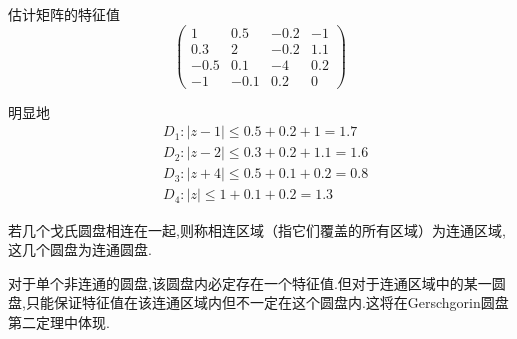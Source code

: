 \begin{brown}
\begin{example}
    估计矩阵的特征值
    \[
    \begin{pmatrix}
        1&0.5&-0.2&-1\\
        0.3&2&-0.2&1.1\\
        -0.5&0.1&-4&0.2\\
        -1&-0.1&0.2&0
    \end{pmatrix}
    \]
\end{example}
\begin{solution}
    明显地
    \begin{align*}
        &D_1: \left|
            z-1
        \right|\leqslant 0.5+0.2+1=1.7\\
        &D_2: \left|
            z-2
        \right|\leqslant 0.3+0.2+1.1=1.6\\
        &D_3: \left|
            z+4
        \right|\leqslant 0.5+0.1+0.2=0.8\\
        &D_4: \left|
            z
        \right|\leqslant 1+0.1+0.2=1.3
    \end{align*}
\end{solution}
\end{brown}
\begin{formal}
\begin{definition}[连通区域]\label{def:连通区域}
    若几个戈氏圆盘相连在一起,则称相连区域（指它们覆盖的所有区域）为连通区域,这几个圆盘为连通圆盘.
\end{definition}
\end{formal}
\begin{red}
\begin{remark}
    对于单个非连通的圆盘,该圆盘内必定存在一个特征值.但对于连通区域中的某一圆盘,只能保证特征值在该连通区域内但不一定在这个圆盘内.这将在\textup{Gerschgorin}圆盘第二定理中体现.
\end{remark}
\end{red}
